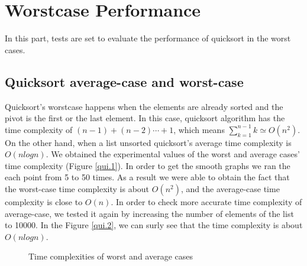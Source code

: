 \documentclass[12pt]{article}
\begin{document}
\section{Worstcase Performance}
In this part, tests are set to evaluate the performance of quicksort in the worst cases.
\subsection{Quicksort average-case and worst-case}
Quicksort's worstcase happens when the elements are already sorted and the pivot is the first
or the last element. In this case, quicksort algorithm has the time complexity of 
$(n-1) + (n-2) \cdots + 1$, which means $\sum^{n-1}_{k=1}k \simeq O(n^{2})$. On the other hand,
when a list unsorted quicksort's average time complexity is $O(nlogn)$. We obtained the 
experimental values of the worst and average cases' time complexity (Figure \ref{qui.1}). 
In order to get the smooth graphs we ran the each point from
 5 to 50 times. As a result we were able to obtain the fact that the worst-case time complexity 
 is about $O(n^{2})$, and the average-case time complexity is close to $O(n)$. In order to
check more accurate time complexity of average-case, we tested it again by increasing 
the number of elements of the list to 10000. In the Figure \ref{qui.2}, 
we can surly see that the time complexity is about $O(nlogn)$.

\begin{figure}[hbt!]
    \centering
    \hfill
    \caption{Time complexities of worst and average cases}
\end{figure}
\end{document}
